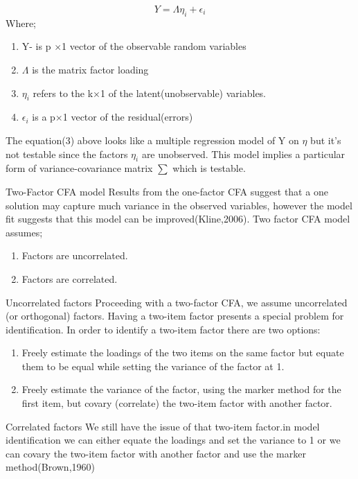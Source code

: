 \documentclass{beamer}
\begin{document}
\begin{frame}
	\begin{equation}
		Y=\Lambda\eta_i + \epsilon_i
	\end{equation}
	Where;
	\begin{enumerate}
		
		\item Y- is p $\times$1 vector of the observable random variables
		\item $\Lambda$ is the matrix factor loading
		\item $\eta_i$ refers to the k$\times$1 of the latent(unobservable) variables.
		\item $\epsilon_i$ is a p$\times$1 vector of the residual(errors)
	\end{enumerate}
The equation(3) above looks like a multiple regression model of Y on $\eta$ but it's not testable since the factors $\eta_i$ are unobserved. This model implies a particular form of variance-covariance matrix $\sum$ which is testable.
\end{frame}
\begin{frame}{Two-Factor CFA model}
	Results from the one-factor CFA suggest that a one solution may capture much variance in the observed variables, however the model fit suggests that this model can be improved(Kline,2006).
	Two factor CFA model assumes;
	\begin{enumerate}
		\item Factors are uncorrelated.
		\item Factors are correlated.
	\end{enumerate}
\end{frame}
\begin{frame}{Uncorrelated factors}
Proceeding with a two-factor CFA, we assume uncorrelated (or orthogonal) factors. Having a two-item factor presents a special problem for identification. In order to identify a two-item factor there are two options:
\begin{enumerate}
	\item  Freely estimate the loadings of the two items on the same factor but equate them to be equal while setting the variance of the factor at 1.
	\item Freely estimate the variance of the factor, using the marker method for the first item, but covary (correlate) the two-item factor with another factor.
\end{enumerate}
\end{frame}
\begin{frame}{Correlated factors}
We still have the issue of that two-item factor.in model identification we can either equate the loadings and set the variance to 1 or we can covary the two-item factor with another factor and use the marker method(Brown,1960)
\end{frame}
\end{document}
